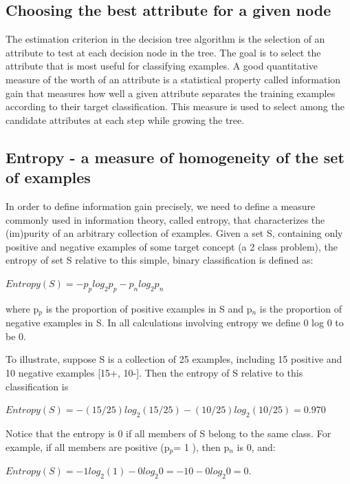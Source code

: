 \documentclass[12pt]{report}
\begin{document}
\subsection{Choosing the best attribute for a given node}
The estimation criterion in the decision tree algorithm is the selection of an attribute to test at each decision node in the tree. The goal is to select the attribute that is most useful for classifying examples. A good quantitative measure of the worth of an attribute is a statistical property called information gain that measures how well a given attribute separates the training examples according to their target classification. This measure is used to select among the candidate attributes at each step while growing the tree. 

\subsection{Entropy - a measure of homogeneity of the set of examples}

In order to define information gain precisely, we need to define a measure commonly used in information theory, called entropy, that characterizes the (im)purity of an arbitrary collection of examples. Given a set S, containing only positive and negative examples of some target concept (a 2 class problem), the entropy of set S relative to this simple, binary classification is defined as:

\begin{math} Entropy(S) =  - p_{p}log_{2} p_{p} - p_{n}log_{2} p_{n} 
\end{math}

where p$_{p}$ is the proportion of positive examples in S and p$_{n}$ is the proportion of negative examples in S. In all calculations involving entropy we define 0 log 0 to be 0. 

To illustrate, suppose S is a collection of 25 examples, including 15 positive and 10 negative examples [15+, 10-]. Then the entropy of S relative to this classification is 

\begin{math} Entropy(S) = - (15/25) log_{2} (15/25) - (10/25) log_{2} (10/25) = 0.970 \end{math}


Notice that the entropy is 0 if all members of S belong to the same class. For example, if all members are positive (p$_{p}$= 1 ), then p$_{n}$ is 0, and:

\begin{math}Entropy(S) = -1 log_{2}(1) - 0 log_{2}0 = -1 0 - 0 log_{2}0 = 0. \end{math}
\end{document}

